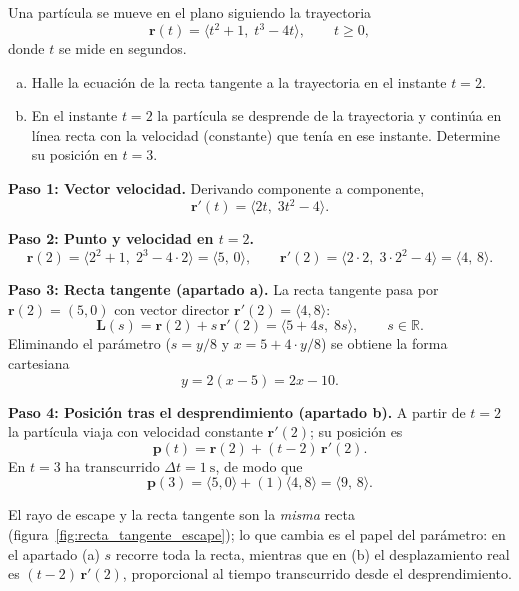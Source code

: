 \begin{prob}
Una partícula se mueve en el plano siguiendo la trayectoria
\[
  \mathbf{r}(t)=\langle t^2+1,\; t^3-4t\rangle, \qquad t\ge 0,
\]
donde $t$ se mide en segundos.
\begin{enumerate}[a)]
  \item Halle la ecuación de la recta tangente a la trayectoria en el
        instante $t=2$.
  \item En el instante $t=2$ la partícula se desprende de la trayectoria y
        continúa en línea recta con la velocidad (constante) que tenía en
        ese instante. Determine su posición en $t=3$.
\end{enumerate}
\begin{myproof}
\textbf{Paso 1: Vector velocidad.}
Derivando componente a componente,
\[
  \mathbf{r}'(t)=\langle 2t,\; 3t^2-4\rangle.
\]

\textbf{Paso 2: Punto y velocidad en $t=2$.}
\[
  \mathbf{r}(2)=\langle 2^2+1,\; 2^3-4\cdot 2\rangle=\langle 5,\,0\rangle,
  \qquad
  \mathbf{r}'(2)=\langle 2\cdot 2,\; 3\cdot 2^2-4\rangle=\langle 4,\,8\rangle.
\]

\textbf{Paso 3: Recta tangente (apartado a).}
La recta tangente pasa por $\mathbf{r}(2)=(5,0)$ con vector director
$\mathbf{r}'(2)=\langle 4,8\rangle$:
\[
  \mathbf{L}(s)=\mathbf{r}(2)+s\,\mathbf{r}'(2)
              =\langle 5+4s,\; 8s\rangle, \qquad s\in\mathbb{R}.
\]
Eliminando el parámetro ($s=y/8$ y $x=5+4\cdot y/8$) se obtiene la forma
cartesiana
\[
  \boxed{\,y=2(x-5)=2x-10.\,}
\]

\textbf{Paso 4: Posición tras el desprendimiento (apartado b).}
A partir de $t=2$ la partícula viaja con velocidad constante
$\mathbf{r}'(2)$; su posición es
\[
  \mathbf{p}(t)=\mathbf{r}(2)+(t-2)\,\mathbf{r}'(2).
\]
En $t=3$ ha transcurrido $\Delta t=1\ \text{s}$, de modo que
\[
  \mathbf{p}(3)=\langle 5,0\rangle+(1)\langle 4,8\rangle
              =\boxed{\langle 9,\,8\rangle.}
\]
\end{myproof}
\end{prob}

\begin{rem}
El rayo de escape y la recta tangente son la \emph{misma} recta
(figura~\ref{fig:recta_tangente_escape}); lo que cambia es el papel del
parámetro: en el apartado (a) $s$ recorre toda la recta, mientras que en (b)
el desplazamiento real es $(t-2)\,\mathbf{r}'(2)$, proporcional al tiempo
transcurrido desde el desprendimiento.
\end{rem}

